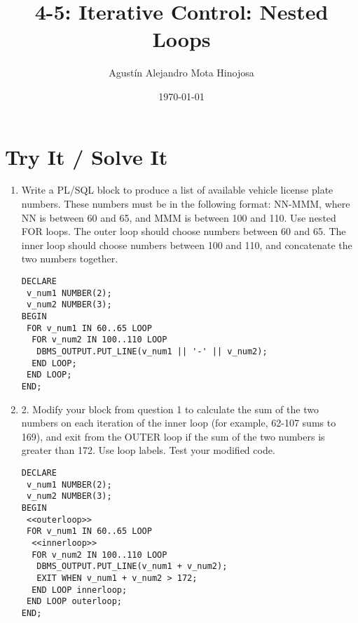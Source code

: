 \documentclass[11pt]{article}
\author{Agustín Alejandro Mota Hinojosa}
\date{\today}
\title{4-5: Iterative Control: Nested Loops}
\begin{document}
\maketitle
\tableofcontents

\section{Try It / Solve It}
\label{sec:org9e3fb80}

\begin{enumerate}
\item Write a PL/SQL block to produce a list of available vehicle license plate numbers. These numbers must be in the following format: NN-MMM, where NN is between 60 and 65, and MMM is between 100 and 110. Use nested FOR loops. The outer loop should choose numbers between 60 and 65. The inner loop should choose numbers between 100 and 110, and concatenate the two numbers together.
\begin{verbatim}
DECLARE
 v_num1 NUMBER(2);
 v_num2 NUMBER(3);
BEGIN
 FOR v_num1 IN 60..65 LOOP
  FOR v_num2 IN 100..110 LOOP
   DBMS_OUTPUT.PUT_LINE(v_num1 || '-' || v_num2);
  END LOOP;
 END LOOP;
END;
\end{verbatim}

\item 2. Modify your block from question 1 to calculate the sum of the two numbers on each iteration of the inner loop (for example, 62-107 sums to 169), and exit from the OUTER loop if the sum of the two numbers is greater than 172. Use loop labels. Test your modified code.
\begin{verbatim}
DECLARE
 v_num1 NUMBER(2);
 v_num2 NUMBER(3);
BEGIN
 <<outerloop>>
 FOR v_num1 IN 60..65 LOOP
  <<innerloop>>
  FOR v_num2 IN 100..110 LOOP
   DBMS_OUTPUT.PUT_LINE(v_num1 + v_num2);
   EXIT WHEN v_num1 + v_num2 > 172;
  END LOOP innerloop;
 END LOOP outerloop;
END;
\end{verbatim}
\end{enumerate}
\end{document}
